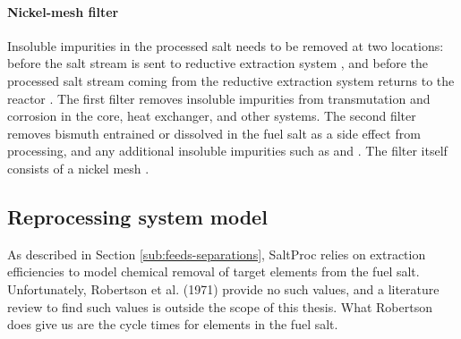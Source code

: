 \paragraph{Nickel-mesh filter}
Insoluble impurities in the processed salt needs to be removed at two locations:
before the salt stream is sent to reductive extraction system
\cite{lindauer_design_1969}, and before the processed salt stream coming
from the reductive extraction system returns to the
reactor \cite{robertson_conceptual_1971}. The first filter removes insoluble
impurities from transmutation and corrosion in the core, heat exchanger, and
other systems. The second filter removes  bismuth entrained or dissolved in the
fuel salt as a side effect from processing, and any additional insoluble
impurities such as  and . The filter itself consists of a
nickel mesh \cite{robertson_conceptual_1971}.


\subsection{Reprocessing system model}
\label{sub:reprocessing-system-model}
As described in Section \ref{sub:feeds-separations}, SaltProc relies on extraction efficiencies to model chemical removal of target elements from the fuel salt.  Unfortunately, Robertson et al. (1971) 
\cite{robertson_conceptual_1971} provide no such values, and a literature review
to find such values is outside the scope of this thesis. What Robertson does
give us are the cycle times for elements in the fuel salt.

